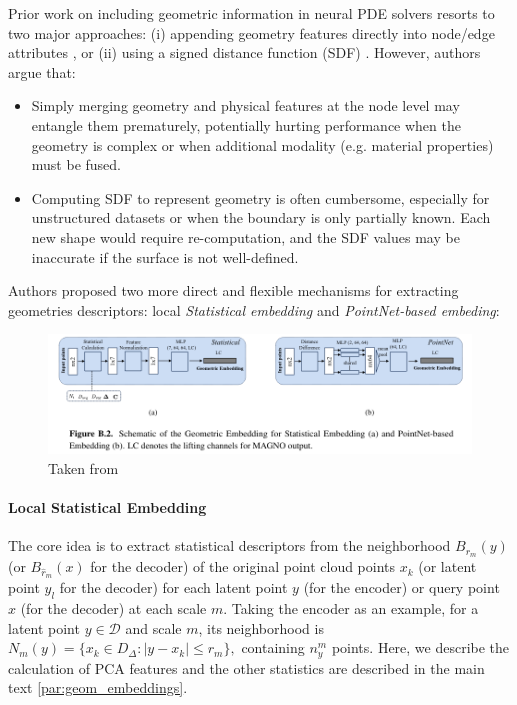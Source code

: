 \documentclass[reqno,10pt]{amsart}
\theoremstyle{plain}
\theoremstyle{definition}
\newcommand{\cal}[1]{\mathcal{#1}}
\begin{document}
\noindent Prior work on including geometric information in neural PDE solvers resorts to two major approaches:
(i) appending geometry features directly into node/edge attributes \cite{SM2025}, or (ii) using a signed distance function (SDF) \cite{ZL2023}. However, authors argue that:
\begin{itemize}\setlength{\itemsep}{0.8em}
    \item Simply merging geometry and physical features at the node level may entangle them prematurely, potentially hurting performance when the geometry is complex or when additional modality (e.g. material properties) must be fused.
    \item Computing SDF to represent geometry is often cumbersome, especially for unstructured datasets or when the boundary is only partially known. Each new shape would require re-computation, and the SDF values may be inaccurate if the surface is not well-defined.
\end{itemize}

\noindent Authors proposed two more direct and flexible mechanisms for extracting geometries descriptors: local {\it Statistical embedding} and {\it PointNet-based embeding}:
\begin{figure}
    \centering
    \includegraphics[width=\textwidth]{geom_embeddings.png}
    \caption{Taken from \cite{SW2025}}
    \label{fig:geom_embedding}
\end{figure}

\paragraph{\bf Local Statistical Embedding} The core idea is to extract statistical descriptors from the neighborhood $B_{r_m}(y)$ (or $B_{\hat{r}_m}(x)$ for the decoder) of the original point cloud points $x_k$ (or latent point $y_l$ for the decoder) for each latent point $y$ (for the encoder) or query point $x$ (for the decoder) at each scale $m$. Taking the encoder as an example, for a latent point $y\in \cal D$ and scale $m$, its neighborhood is $N_m(y) = \{x_k \in D_\Delta : |y-x_k| \leq r_m\},$ containing $n^m_y$ points. Here, we describe the calculation of PCA features and the other statistics are described in the main text \ref{par:geom_embeddings}.
\end{document}
